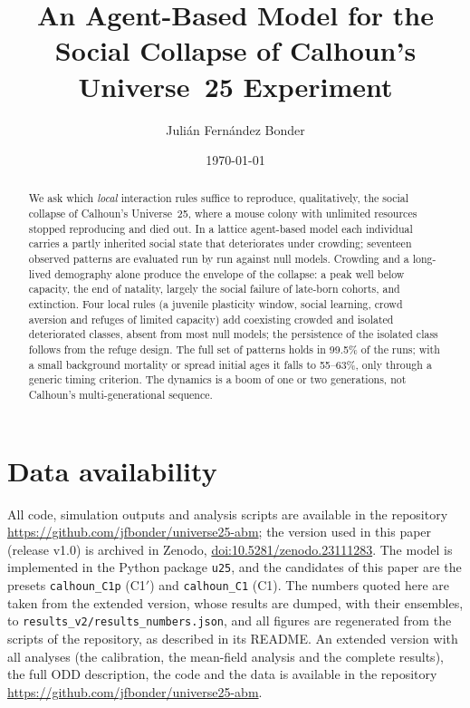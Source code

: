 \documentclass[pre,twocolumn,superscriptaddress,showpacs]{revtex4-2}
\newcommand{\repourl}{\url{https://github.com/jfbonder/universe25-abm}}
\newcommand{\zenododoi}[1]{\href{https://doi.org/#1}{doi:#1}}
\begin{document}
\title{An Agent-Based Model for the Social Collapse of Calhoun's Universe~25 Experiment}

\author{Julián Fernández Bonder}

\date{\today}

\begin{abstract}
We ask which \emph{local} interaction rules suffice to reproduce, qualitatively, the social collapse of Calhoun's
Universe~25, where a mouse colony with unlimited resources stopped reproducing and died out.
In a lattice agent-based model each individual carries a partly inherited social state that deteriorates under
crowding; seventeen observed patterns are evaluated run by run against null models.
Crowding and a long-lived demography alone produce the envelope of the collapse: a peak well below
capacity, the end of natality, largely the social failure of late-born cohorts, and extinction.
Four local rules (a juvenile plasticity window, social learning, crowd aversion and refuges of limited capacity) add
coexisting crowded and isolated deteriorated classes, absent from most null models; the persistence of the isolated
class follows from the refuge design.
The full set of patterns holds in 99.5\% of the runs; with a small background mortality or spread initial ages it
falls to 55--63\%, only through a generic timing criterion.
The dynamics is a boom of one or two generations, not Calhoun's multi-generational sequence.
\end{abstract}

\maketitle







\section*{Data availability}
All code, simulation outputs and analysis scripts are available in the repository \repourl; the version
used in this paper (release v1.0) is archived in Zenodo, \zenododoi{10.5281/zenodo.23111283}. The model is implemented in the Python package
\texttt{u25}, and the candidates of this paper are the presets \texttt{calhoun\_C1p} (\textsf{C1}$'$) and
\texttt{calhoun\_C1} (\textsf{C1}). The numbers quoted here are taken from the extended version, whose results are
dumped, with their ensembles, to \texttt{results\_v2/results\_numbers.json}, and all figures are regenerated from the scripts of the
repository, as described in its README. An extended version with all analyses (the calibration, the mean-field analysis and the complete
results), the full ODD description, the code and the data is available in the repository \repourl.
\end{document}
